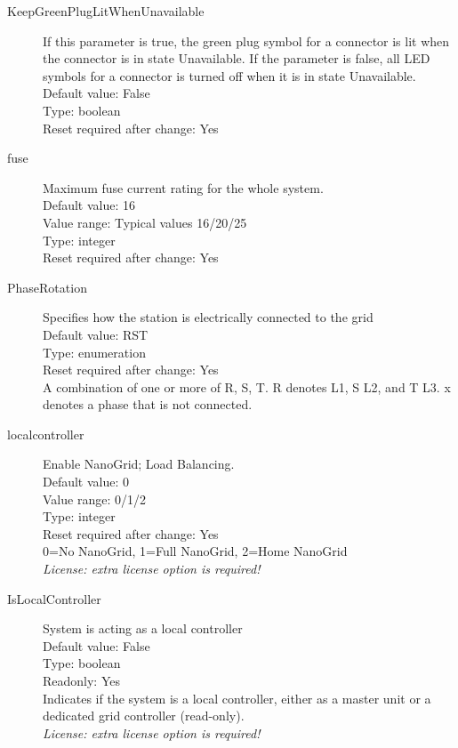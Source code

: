 \begin{description}
\item[KeepGreenPlugLitWhenUnavailable] If this parameter is true, the green plug symbol for a connector is lit when the connector is in state Unavailable. If the parameter is false, all LED symbols for a connector is turned off when it is in state Unavailable.\\
  Default value: False\\
  Type: boolean\\
  Reset required after change: Yes\\

\item[fuse] Maximum fuse current rating for the whole system.\\
  Default value: 16\\
  Value range: Typical values 16/20/25\\
  Type: integer\\
  Reset required after change: Yes\\

\item[PhaseRotation] Specifies how the station is electrically connected to the grid\\
  Default value: RST\\
  Type: enumeration\\
  Reset required after change: Yes\\
  A combination of one or more of R, S, T. R denotes L1, S L2, and T L3. x denotes a phase that is not connected.\\

\item[localcontroller] Enable NanoGrid; Load Balancing.\\
  Default value: 0\\
  Value range: 0/1/2\\
  Type: integer\\
  Reset required after change: Yes\\
  0=No NanoGrid, 1=Full NanoGrid, 2=Home NanoGrid\\
  \emph{License: extra license option is required!}\\

\item[IsLocalController] System is acting as a local controller\\
  Default value: False\\
  Type: boolean\\
  Readonly: Yes\\
  Indicates if the system is a local controller, either as a master unit or a dedicated grid controller (read-only).\\
  \emph{License: extra license option is required!}\\


\end{description}
